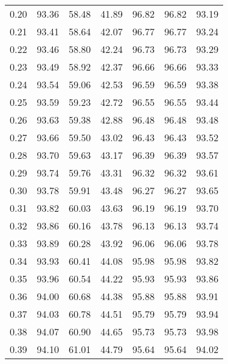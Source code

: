 \begin{tabular}{|c|c|c|c|c|c|c|}
      0.20 &     93.36 &     58.48 &      41.89 &   96.82 &      96.82 &         93.19 \\
      0.21 &     93.41 &     58.64 &      42.07 &   96.77 &      96.77 &         93.24 \\
      0.22 &     93.46 &     58.80 &      42.24 &   96.73 &      96.73 &         93.29 \\
      0.23 &     93.49 &     58.92 &      42.37 &   96.66 &      96.66 &         93.33 \\
      0.24 &     93.54 &     59.06 &      42.53 &   96.59 &      96.59 &         93.38 \\
      0.25 &     93.59 &     59.23 &      42.72 &   96.55 &      96.55 &         93.44 \\
      0.26 &     93.63 &     59.38 &      42.88 &   96.48 &      96.48 &         93.48 \\
      0.27 &     93.66 &     59.50 &      43.02 &   96.43 &      96.43 &         93.52 \\
      0.28 &     93.70 &     59.63 &      43.17 &   96.39 &      96.39 &         93.57 \\
      0.29 &     93.74 &     59.76 &      43.31 &   96.32 &      96.32 &         93.61 \\
      0.30 &     93.78 &     59.91 &      43.48 &   96.27 &      96.27 &         93.65 \\
      0.31 &     93.82 &     60.03 &      43.63 &   96.19 &      96.19 &         93.70 \\
      0.32 &     93.86 &     60.16 &      43.78 &   96.13 &      96.13 &         93.74 \\
      0.33 &     93.89 &     60.28 &      43.92 &   96.06 &      96.06 &         93.78 \\
      0.34 &     93.93 &     60.41 &      44.08 &   95.98 &      95.98 &         93.82 \\
      0.35 &     93.96 &     60.54 &      44.22 &   95.93 &      95.93 &         93.86 \\
      0.36 &     94.00 &     60.68 &      44.38 &   95.88 &      95.88 &         93.91 \\
      0.37 &     94.03 &     60.78 &      44.51 &   95.79 &      95.79 &         93.94 \\
      0.38 &     94.07 &     60.90 &      44.65 &   95.73 &      95.73 &         93.98 \\
      0.39 &     94.10 &     61.01 &      44.79 &   95.64 &      95.64 &         94.02 \\

\end{tabular}
